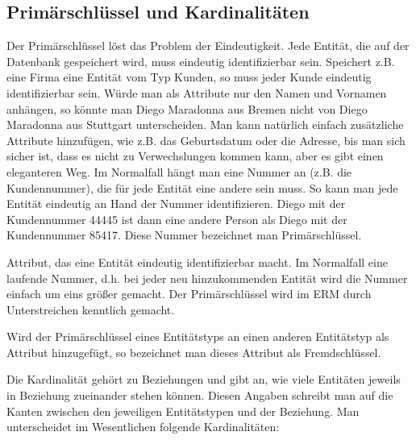 \subsection{Primärschlüssel und Kardinalitäten}
Der Primärschlüssel löst das Problem der Eindeutigkeit. Jede Entität, die auf der Datenbank gespeichert wird, muss eindeutig identifizierbar sein. Speichert z.B. eine Firma eine Entität  vom Typ Kunden, so muss jeder Kunde eindeutig identifizierbar sein. Würde man als Attribute nur den Namen und Vornamen anhängen, so könnte man Diego Maradonna aus Bremen nicht von Diego Maradonna aus Stuttgart unterscheiden. Man kann natürlich einfach zusätzliche Attribute hinzufügen, wie z.B. das Geburtsdatum oder die Adresse, bis man sich sicher ist, dass es nicht zu Verwechslungen kommen kann, aber es gibt einen eleganteren Weg. Im Normalfall hängt man eine Nummer an (z.B. die Kundennummer), die für jede Entität eine andere sein muss. So kann man jede Entität eindeutig an Hand der Nummer identifizieren. Diego mit der Kundennummer 44445 ist dann eine andere Person als Diego mit der Kundennummer 85417. Diese Nummer bezeichnet man Primärschlüssel.
\begin{tcolorbox}[title=Primärschlüssel]
	Attribut, das eine Entität eindeutig identifizierbar macht. Im Normalfall eine laufende Nummer, d.h. bei jeder neu hinzukommenden Entität wird die Nummer einfach um eins größer gemacht. Der Primärschlüssel wird im ERM durch Unterstreichen kenntlich gemacht.
\end{tcolorbox}
\begin{tcolorbox}[title=Fremdschlüssel]
	Wird der Primärschlüssel eines Entitätstyps an einen anderen Entitätstyp als Attribut hinzugefügt, so bezeichnet man dieses Attribut als Fremdschlüssel.
\end{tcolorbox}
Die Kardinalität gehört zu Beziehungen und gibt an, wie viele Entitäten jeweils in Beziehung zueinander stehen können. Diesen Angaben schreibt man auf die Kanten zwischen den jeweiligen Entitätstypen und der Beziehung. Man unterscheidet im Wesentlichen folgende Kardinalitäten:

